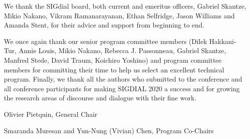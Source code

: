 We thank the SIGdial board, both current and emeritus officers, Gabriel Skantze, Mikio Nakano, Vikram Ramanarayanan, Ethan Selfridge, Jason Williams and Amanda Stent, for their advice and support from beginning to end.

We once again thank our senior program committee members (Dilek Hakkani-Tur,    Annie Louis, Mikio Nakano, Rebecca J. Passonneau, Gabriel Skantze,  Manfred Stede, David Traum, Koichiro Yoshino) and program committee members for committing their time to help us select an excellent technical program. Finally, we thank all the authors who submitted to the conference and all conference participants for making SIGDIAL 2020 a success and for growing the research areas of discourse and dialogue with their fine work.


Olivier Pietquin, General Chair

Smaranda Muresan and Yun-Nung (Vivian) Chen, Program Co-Chairs

